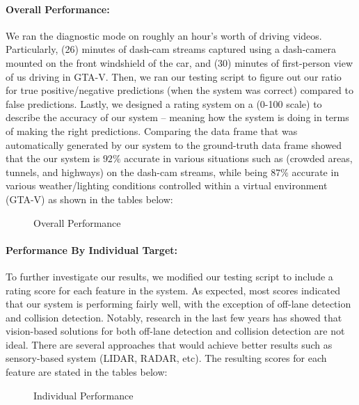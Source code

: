 \paragraph{Overall Performance:} We ran the diagnostic mode on roughly an hour's worth of driving videos. Particularly, (26) minutes of dash-cam streams captured using a dash-camera mounted on the front windshield of the car, and (30) minutes of first-person view of us driving in GTA-V. Then, we ran our testing script to figure out our ratio for true positive/negative predictions (when the system was correct) compared to false predictions. Lastly, we designed a rating system on a (0-100 scale) to describe the accuracy of our system -- meaning how the system is doing in terms of making the right predictions. Comparing the data frame that was automatically generated by our system to the ground-truth data frame showed that the our system is $92\%$ accurate in various situations such as (crowded areas, tunnels, and highways) on the dash-cam streams, while being $87\%$ accurate in various weather/lighting conditions controlled within a virtual environment (GTA-V) as shown in the tables below: 


\begin{figure}[h!]
  \centering
  \qquad 
  \caption{Overall Performance}
\end{figure}


\paragraph{Performance By Individual Target:} To further investigate our results, we modified our testing script to include a rating score for each feature in the system. As expected, most scores indicated that our system is performing fairly well, with the exception of off-lane detection and collision detection. Notably, research in the last few years has showed that vision-based solutions for both off-lane detection and collision detection are not ideal. There are several approaches that would achieve better results such as sensory-based system (LIDAR, RADAR, etc). The resulting scores for each feature are stated in the tables below: 

\begin{figure}[h!]
  \centering
  \qquad
  \caption{Individual Performance}
\end{figure}
\par 



